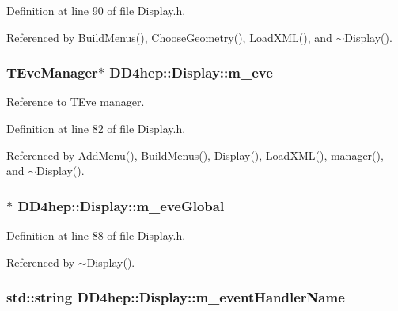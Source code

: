 Definition at line 90 of file Display.h.

Referenced by BuildMenus(), ChooseGeometry(), LoadXML(), and $\sim$Display().\hypertarget{class_d_d4hep_1_1_display_a22aad63fdd7d2db0720957c9117ee794}{
\subsubsection[{m\_\-eve}]{\setlength{\rightskip}{0pt plus 5cm}TEveManager$\ast$ {\bf DD4hep::Display::m\_\-eve}}}
\label{class_d_d4hep_1_1_display_a22aad63fdd7d2db0720957c9117ee794}


Reference to TEve manager. 

Definition at line 82 of file Display.h.

Referenced by AddMenu(), BuildMenus(), Display(), LoadXML(), manager(), and $\sim$Display().\hypertarget{class_d_d4hep_1_1_display_a8d60b9f25c9907af4f9efa64363d8c85}{
\subsubsection[{m\_\-eveGlobal}]{$\ast$ {\bf DD4hep::Display::m\_\-eveGlobal}}}
\label{class_d_d4hep_1_1_display_a8d60b9f25c9907af4f9efa64363d8c85}


Definition at line 88 of file Display.h.

Referenced by $\sim$Display().\hypertarget{class_d_d4hep_1_1_display_a0a6d204fcf140071018ef6cb3040c19b}{
\subsubsection[{m\_\-eventHandlerName}]{\setlength{\rightskip}{0pt plus 5cm}std::string {\bf DD4hep::Display::m\_\-eventHandlerName}}}
\label{class_d_d4hep_1_1_display_a0a6d204fcf140071018ef6cb3040c19b}


